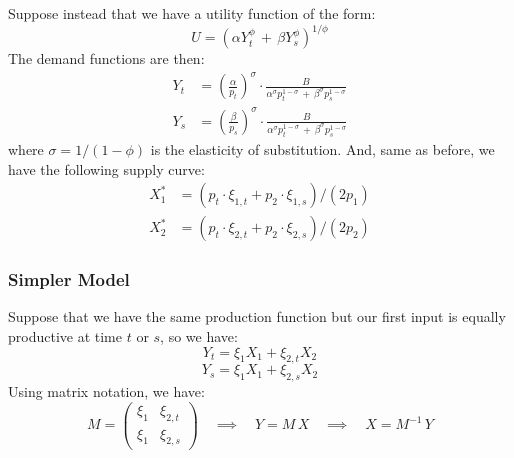 \documentclass[12pt,a4paper]{extarticle}
\begin{document}
Suppose instead that we have a utility function of the form:
$$U = (\alpha Y_t^\phi \, + \, \beta Y_s^\phi)^{1/\phi}$$
The demand functions are then:
\begin{align*}
Y_t &= \left(\frac{\alpha}{p_t}\right)^\sigma \cdot \frac{B}{\alpha^\sigma p_t^{1-\sigma} \, + \, \beta^\sigma p_s^{1-\sigma}} \\
Y_s &= \left(\frac{\beta}{p_s}\right)^\sigma \cdot \frac{B}{\alpha^\sigma p_t^{1-\sigma} \, + \, \beta^\sigma p_s^{1-\sigma}}
\end{align*}
where $\sigma = 1 / (1 - \phi)$ is the elasticity of substitution. And, same as before, we have the following supply curve:
\begin{align*}
X_1^* &= \left( p_t \cdot \xi_{1,t} + p_2 \cdot \xi_{1,s} \right) / (2 p_1) \\
X_2^* &= \left( p_t \cdot \xi_{2,t} + p_2 \cdot \xi_{2,s} \right) / (2 p_2) 
\end{align*}
  
  
\subsubsection{Simpler Model}


	

Suppose that we have the same production function but our first input is equally productive at time $t$ or $s$, so we have:
$$Y_t = \xi_{1} X_1 + \xi_{2,t} X_2$$
$$Y_s = \xi_{1} X_1 + \xi_{2,s} X_2$$
Using matrix notation, we have:
$$M = 
\begin{pmatrix}
\xi_1 & \xi_{2,t} \\
\xi_1 & \xi_{2,s}
\end{pmatrix}
\quad \implies \quad 
Y = M \, X \quad \implies \quad X = M^{-1} \, Y$$
\end{document}

